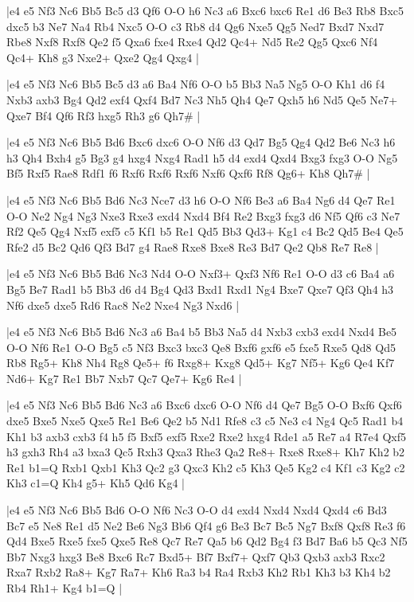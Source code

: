 \whitename{}
\blackname{}
\makegametitle
|e4 e5 Nf3 Nc6 Bb5 Bc5 d3 Qf6 O-O h6 Nc3 a6 Bxc6 bxc6 Re1 d6 Be3 Rb8 Bxc5 dxc5 b3 Ne7 Na4 Rb4 Nxc5 O-O c3 Rb8 d4 Qg6 Nxe5 Qg5 Ned7 Bxd7 Nxd7 Rbe8 Nxf8 Rxf8 Qe2 f5 Qxa6 fxe4 Rxe4 Qd2 Qc4+ Nd5 Re2 Qg5 Qxc6 Nf4 Qc4+ Kh8 g3 Nxe2+ Qxe2 Qg4 Qxg4  |

\whitename{}
\blackname{}
\makegametitle
|e4 e5 Nf3 Nc6 Bb5 Bc5 d3 a6 Ba4 Nf6 O-O b5 Bb3 Na5 Ng5 O-O Kh1 d6 f4 Nxb3 axb3 Bg4 Qd2 exf4 Qxf4 Bd7 Nc3 Nh5 Qh4 Qe7 Qxh5 h6 Nd5 Qe5 Ne7+ Qxe7 Bf4 Qf6 Rf3 hxg5 Rh3 g6 Qh7\#  |

\whitename{}
\blackname{}
\makegametitle
|e4 e5 Nf3 Nc6 Bb5 Bd6 Bxc6 dxc6 O-O Nf6 d3 Qd7 Bg5 Qg4 Qd2 Be6 Nc3 h6 h3 Qh4 Bxh4 g5 Bg3 g4 hxg4 Nxg4 Rad1 h5 d4 exd4 Qxd4 Bxg3 fxg3 O-O Ng5 Bf5 Rxf5 Rae8 Rdf1 f6 Rxf6 Rxf6 Rxf6 Nxf6 Qxf6 Rf8 Qg6+ Kh8 Qh7\#  |

\whitename{}
\blackname{}
\makegametitle
|e4 e5 Nf3 Nc6 Bb5 Bd6 Nc3 Nce7 d3 h6 O-O Nf6 Be3 a6 Ba4 Ng6 d4 Qe7 Re1 O-O Ne2 Ng4 Ng3 Nxe3 Rxe3 exd4 Nxd4 Bf4 Re2 Bxg3 fxg3 d6 Nf5 Qf6 c3 Ne7 Rf2 Qe5 Qg4 Nxf5 exf5 c5 Kf1 b5 Re1 Qd5 Bb3 Qd3+ Kg1 c4 Bc2 Qd5 Be4 Qe5 Rfe2 d5 Bc2 Qd6 Qf3 Bd7 g4 Rae8 Rxe8 Bxe8 Re3 Bd7 Qe2 Qb8 Re7 Re8  |

\whitename{}
\blackname{}
\makegametitle
|e4 e5 Nf3 Nc6 Bb5 Bd6 Nc3 Nd4 O-O Nxf3+ Qxf3 Nf6 Re1 O-O d3 c6 Ba4 a6 Bg5 Be7 Rad1 b5 Bb3 d6 d4 Bg4 Qd3 Bxd1 Rxd1 Ng4 Bxe7 Qxe7 Qf3 Qh4 h3 Nf6 dxe5 dxe5 Rd6 Rac8 Ne2 Nxe4 Ng3 Nxd6  |

\whitename{}
\blackname{}
\makegametitle
|e4 e5 Nf3 Nc6 Bb5 Bd6 Nc3 a6 Ba4 b5 Bb3 Na5 d4 Nxb3 cxb3 exd4 Nxd4 Be5 O-O Nf6 Re1 O-O Bg5 c5 Nf3 Bxc3 bxc3 Qe8 Bxf6 gxf6 e5 fxe5 Rxe5 Qd8 Qd5 Rb8 Rg5+ Kh8 Nh4 Rg8 Qe5+ f6 Rxg8+ Kxg8 Qd5+ Kg7 Nf5+ Kg6 Qe4 Kf7 Nd6+ Kg7 Re1 Bb7 Nxb7 Qc7 Qe7+ Kg6 Re4  |

\whitename{}
\blackname{}
\makegametitle
|e4 e5 Nf3 Nc6 Bb5 Bd6 Nc3 a6 Bxc6 dxc6 O-O Nf6 d4 Qe7 Bg5 O-O Bxf6 Qxf6 dxe5 Bxe5 Nxe5 Qxe5 Re1 Be6 Qe2 b5 Nd1 Rfe8 c3 c5 Ne3 c4 Ng4 Qc5 Rad1 b4 Kh1 b3 axb3 cxb3 f4 h5 f5 Bxf5 exf5 Rxe2 Rxe2 hxg4 Rde1 a5 Re7 a4 R7e4 Qxf5 h3 gxh3 Rh4 a3 bxa3 Qc5 Rxh3 Qxa3 Rhe3 Qa2 Re8+ Rxe8 Rxe8+ Kh7 Kh2 b2 Re1 b1=Q Rxb1 Qxb1 Kh3 Qc2 g3 Qxc3 Kh2 c5 Kh3 Qe5 Kg2 c4 Kf1 c3 Kg2 c2 Kh3 c1=Q Kh4 g5+ Kh5 Qd6 Kg4  |

\whitename{}
\blackname{}
\makegametitle
|e4 e5 Nf3 Nc6 Bb5 Bd6 O-O Nf6 Nc3 O-O d4 exd4 Nxd4 Nxd4 Qxd4 c6 Bd3 Bc7 e5 Ne8 Re1 d5 Ne2 Be6 Ng3 Bb6 Qf4 g6 Be3 Bc7 Bc5 Ng7 Bxf8 Qxf8 Re3 f6 Qd4 Bxe5 Rxe5 fxe5 Qxe5 Re8 Qc7 Re7 Qa5 b6 Qd2 Bg4 f3 Bd7 Ba6 b5 Qc3 Nf5 Bb7 Nxg3 hxg3 Be8 Bxc6 Rc7 Bxd5+ Bf7 Bxf7+ Qxf7 Qb3 Qxb3 axb3 Rxc2 Rxa7 Rxb2 Ra8+ Kg7 Ra7+ Kh6 Ra3 b4 Ra4 Rxb3 Kh2 Rb1 Kh3 b3 Kh4 b2 Rb4 Rh1+ Kg4 b1=Q  |

